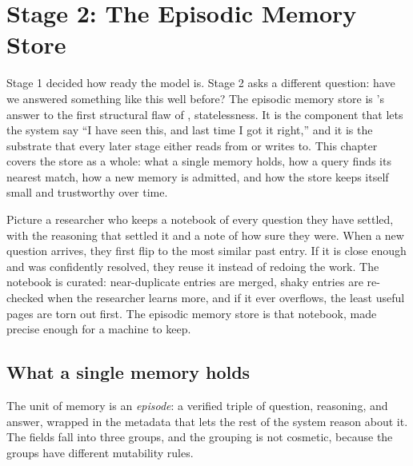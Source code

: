 \chapter{Stage 2: The Episodic Memory Store}
\label{ch:memory}

Stage 1 decided how ready the model is. Stage 2 asks a different question: have we
answered something like this well before? The episodic memory store is \caem{}'s
answer to the first structural flaw of , statelessness. It is the
component that lets the system say ``I have seen this, and last time I got it
right,'' and it is the substrate that every later stage either reads from or writes
to. This chapter covers the store as a whole: what a single memory holds, how a
query finds its nearest match, how a new memory is admitted, and how the store
keeps itself small and trustworthy over time.

\begin{intuition}
Picture a researcher who keeps a notebook of every question they have settled, with
the reasoning that settled it and a note of how sure they were. When a new question
arrives, they first flip to the most similar past entry. If it is close enough and
was confidently resolved, they reuse it instead of redoing the work. The notebook is
curated: near-duplicate entries are merged, shaky entries are re-checked when the
researcher learns more, and if it ever overflows, the least useful pages are torn
out first. The episodic memory store is that notebook, made precise enough for a
machine to keep.
\end{intuition}

\section{What a single memory holds}
\label{sec:memory-episode}

The unit of memory is an \emph{episode}: a verified triple of question, reasoning,
and answer, wrapped in the metadata that lets the rest of the system reason about
it. The fields fall into three groups, and the grouping is not cosmetic, because the
groups have different mutability rules.

